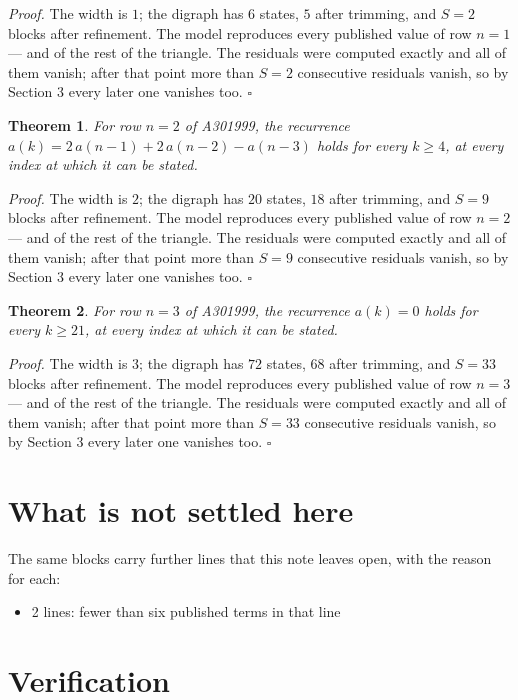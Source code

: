 \documentclass[11pt]{article}
\newtheorem{theorem}{Theorem}
\theoremstyle{definition}
\begin{document}
{\itshape Proof.} The width is $1$; the digraph has $6$ states, $5$ after trimming, and $S = 2$ blocks after refinement. The model reproduces every published value of row $n = 1$ --- and of the rest of the triangle. The residuals were computed exactly and all of them vanish; after that point more than $S = 2$ consecutive residuals vanish, so by Section 3 every later one vanishes too. $\square$

\begin{theorem} For row $n = 2$ of A301999, the recurrence $a(k) = 2\,a(n-1) + 2\,a(n-2) - a(n-3)$ holds for every $k \ge 4$, at every index at which it can be stated.\end{theorem}

{\itshape Proof.} The width is $2$; the digraph has $20$ states, $18$ after trimming, and $S = 9$ blocks after refinement. The model reproduces every published value of row $n = 2$ --- and of the rest of the triangle. The residuals were computed exactly and all of them vanish; after that point more than $S = 9$ consecutive residuals vanish, so by Section 3 every later one vanishes too. $\square$

\begin{theorem} For row $n = 3$ of A301999, the recurrence $a(k) = 0$ holds for every $k \ge 21$, at every index at which it can be stated.\end{theorem}

{\itshape Proof.} The width is $3$; the digraph has $72$ states, $68$ after trimming, and $S = 33$ blocks after refinement. The model reproduces every published value of row $n = 3$ --- and of the rest of the triangle. The residuals were computed exactly and all of them vanish; after that point more than $S = 33$ consecutive residuals vanish, so by Section 3 every later one vanishes too. $\square$

\section{What is not settled here}

The same blocks carry further lines that this note leaves open, with the reason for each:

\begin{itemize}

\item 2 lines: fewer than six published terms in that line

\end{itemize}

\section{Verification}
\end{document}
